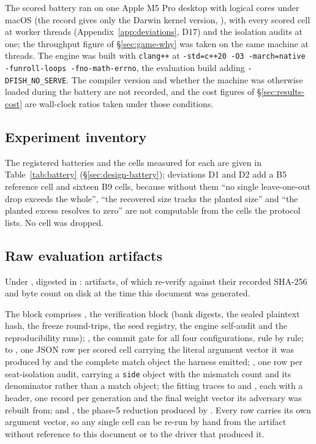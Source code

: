 The scored battery ran on one Apple M5 Pro desktop with \vsevenMachineCores{} logical cores under
macOS (the record gives only the Darwin kernel version, \vsevenDarwinVersion{}), with every scored
cell at \vsevenScoredThreads{} worker threads
(Appendix~\ref{app:deviations}, D17) and the isolation audits at one; the throughput figure of
\S\ref{sec:game-why} was taken on the same machine at \vsevenMirrorThreads{} threads. The engine
was built with \texttt{clang++} at \texttt{-std=c++20 -O3 -march=native -funroll-loops
-fno-math-errno}, the evaluation build adding \texttt{-DFISH\_NO\_SERVE}. The compiler version and
whether the machine was otherwise loaded during the battery are not recorded, and the cost figures
of \S\ref{sec:results-cost} are wall-clock ratios taken under those conditions.

\subsection*{Experiment inventory}

The registered batteries and the cells measured for each are given in Table~\ref{tab:battery}
(\S\ref{sec:design-battery}); deviations D1 and D2 add a B5 reference cell and sixteen B9 cells,
because without them ``no single leave-one-out drop exceeds the whole'', ``the recovered size
tracks the planted size'' and ``the planted excess resolves to zero'' are not computable from the
cells the protocol lists. No cell was dropped.

\subsection*{Raw evaluation artifacts}

Under , digested in
: \vsevenManifestRuns{} artifacts, of which
\vsevenManifestVerified{} re-verify against their recorded SHA-256 and byte count on disk at the time
this document was generated.

The block comprises , the verification block (bank digests, the sealed
plaintext hash, the freeze round-trips, the seed registry, the engine self-audit and the
reproducibility runs); , the commit gate for all four configurations, rule
by rule;  to , one JSON row per scored cell carrying
the literal argument vector it was produced by and the complete match object the harness emitted;
, one row per seat-isolation audit, carrying a \texttt{side} object with the
mismatch count and its denominator rather than a match object; the fitting traces
 to  and , each with a
header, one record per generation and the final weight vector its adversary was rebuilt from; and
, the phase-5 reduction produced by . Every
row carries its own argument vector, so any single cell can be re-run by hand from the artifact
without reference to this document or to the driver that produced it.

